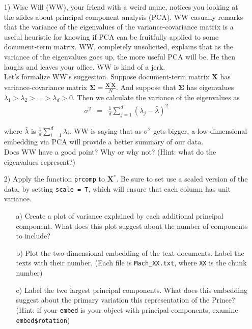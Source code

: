 \documentclass[12pt,letterpaper]{article}
\begin{document}
\begin{itemize}
\item[1)]  Wise Will (WW), your friend with a weird name, notices you looking at the slides about principal component analysis (PCA).   WW casually remarks that the variance of the eigenvalues of the variance-covariance matrix is a useful heuristic for knowing if PCA can be fruitfully applied to some document-term matrix.  WW, completely unsolicited, explains that as the variance of the eigenvalues goes up, the more useful PCA will be.  He then laughs and leaves your office.  WW is kind of a jerk.   \\

Let's formalize WW's suggestion. Suppose document-term matrix $\boldsymbol{X}$ has variance-covariance matrix $\boldsymbol{\Sigma} = \frac{\boldsymbol{X}^{'}\boldsymbol{X}}{N}$.  And suppose that $\boldsymbol{\Sigma}$ has eigenvalues $\lambda_{1}>\lambda_{2}>\hdots > \lambda_{d}>0$. Then we calculate the variance of the eigenvalues as
\begin{eqnarray}
\sigma^{2} & = & \frac{1}{d} \sum_{j=1}^{d}(\lambda_{j} - \bar{\lambda})^{2} \nonumber
\end{eqnarray}

where $\bar{\lambda}$ is $\frac{1}{d} \sum_{i=1}^{d} \lambda_{i}$. WW is saying that as $\sigma^{2}$ gets bigger, a low-dimensional embedding via PCA will provide a better summary of our data.   \\

Does WW have a good point?  Why or why not? (Hint: what do the eigenvalues represent?)
\item[2)] Apply the function {\tt prcomp} to $\boldsymbol{X}^{*}$. Be sure to set use a scaled version of the data, by setting {\tt scale = T}, which will ensure that each column has unit variance.
\begin{itemize}
\item[a)] Create a plot of variance explained by each additional principal component. What does this plot suggest about the number of components to include?
\item[b)] Plot the two-dimensional embedding of the text documents.  Label the texts with their number.  (Each file is {\tt Mach\_XX.txt}, where {\tt XX} is the chunk number)
\item[c)] Label the two largest principal components.  What does this embedding suggest about the primary variation this representation of the Prince?  (Hint: if your {\tt embed} is your object with principal components, examine {\tt embed\$rotation})
\end{itemize}



\end{itemize}
\end{document}
